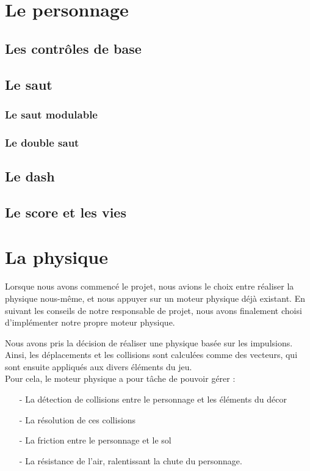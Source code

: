\documentclass[10pt]{report}
\begin{document}
\section{Le personnage}
\subsection{Les contrôles de base}
\subsection{Le saut}
\subsubsection{Le saut modulable}
\subsubsection{Le double saut}
\subsection{Le dash}
\subsection{Le score et les vies}

\section{La physique}
Lorsque nous avons commencé le projet, nous avions le choix entre réaliser la physique nous-même, et nous appuyer sur un moteur physique déjà existant.
En suivant les conseils de notre responsable de projet, nous avons finalement choisi d'implémenter notre propre moteur physique.\par

Nous avons pris la décision de réaliser une physique basée sur les impulsions.
Ainsi, les déplacements et les collisions sont calculées comme des vecteurs, qui sont ensuite appliqués aux divers éléments du jeu.\\
Pour cela, le moteur physique a pour tâche de pouvoir gérer :
\begin{itemize}
  \item[-] La détection de collisions entre le personnage et les éléments du décor
  \item[-] La résolution de ces collisions
  \item[-] La friction entre le personnage et le sol
  \item[-] La résistance de l'air, ralentissant la chute du personnage.
\end{itemize}
\end{document}
